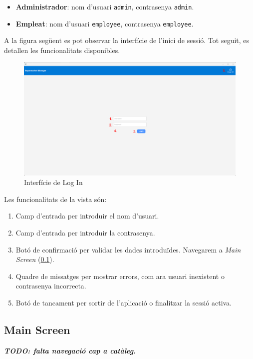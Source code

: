 \documentclass[a4paper,12pt]{article}
\begin{document}
	\begin{itemize}
		\item \textbf{Administrador}: nom d'usuari \texttt{admin}, contrasenya \texttt{admin}.
		\item \textbf{Empleat}: nom d'usuari \texttt{employee}, contrasenya \texttt{employee}.
	\end{itemize}
	
	A la figura següent es pot observar la interfície de l'inici de sessió. Tot seguit, es detallen les funcionalitats disponibles.
	
	\begin{figure}[H] 
		\centering
		\includegraphics[width=0.75\linewidth]{assets/login.png}
		\caption{Interfície de Log In}
	\end{figure}
	
	\noindent Les funcionalitats de la vista són:
	
	\begin{enumerate}[itemsep=0pt, topsep=0pt]
		\item Camp d'entrada per introduir el nom d'usuari.
		\item Camp d'entrada per introduir la contrasenya.
		\item Botó de confirmació per validar les dades introduïdes. Navegarem a \textit{Main Screen} (\ref{sec:mainScreen}).
		\item Quadre de missatges per mostrar errors, com ara usuari inexistent o contrasenya incorrecta.
		\item Botó de tancament per sortir de l'aplicació o finalitzar la sessió activa.
	\end{enumerate}
	
	\newpage
	\subsection{Main Screen}
	\label{sec:mainScreen}
	
	\textbf{\textit{TODO: falta navegació cap a catàleg.}}
	
\end{document}
